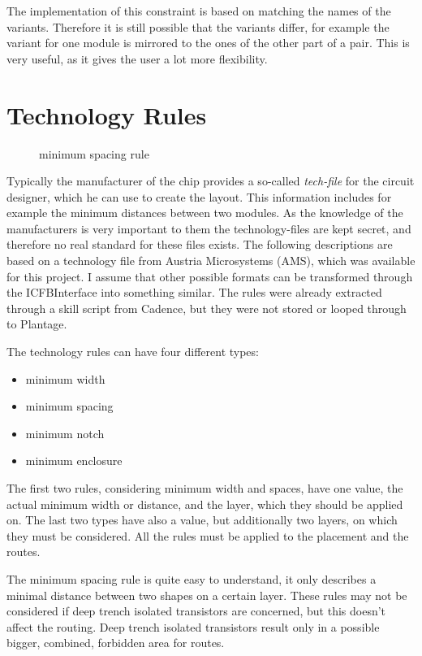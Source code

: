 The implementation of this constraint is based on matching the names of the variants. Therefore it is still possible that the variants differ, for example the variant for one module is mirrored to the ones of the other part of a pair. This is very useful, as it gives the user a lot more flexibility.

\section{Technology Rules}

\begin{figure}
	\centering
	
	\caption{minimum spacing rule}
	\label{fig:technology_rule_spacing}
\end{figure}

Typically the manufacturer of the chip provides a so-called \textit{tech-file} for the circuit designer, which he can use to create the layout. This information includes for example the minimum distances between two modules. As the knowledge of the manufacturers is very important to them the technology-files are kept secret, and therefore no real standard for these files exists. The following descriptions are based on a technology file from Austria Microsystems (AMS), which was available for this project. I assume that other possible formats can be transformed through the ICFBInterface into something similar. The rules were already extracted through a skill script from Cadence, but they were not stored or looped through to Plantage. 

The technology rules can have four different types:

\begin{itemize}
\item minimum width
\item minimum spacing
\item minimum notch
\item minimum enclosure
\end{itemize}

The first two rules, considering minimum width and spaces, have one value, the actual minimum width or distance, and the layer, which they should be applied on. The last two types have also a value, but additionally two layers, on which they must be considered. All the rules must be applied to the placement and the routes.

The minimum spacing rule  is quite easy to understand, it only describes a minimal distance between two shapes on a certain layer. These rules may not be considered if deep trench isolated transistors are concerned, but this doesn't affect the routing. Deep trench isolated transistors result only in a possible bigger, combined, forbidden area for routes.

